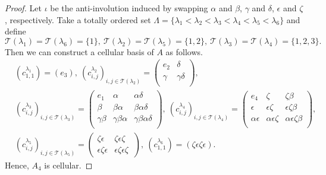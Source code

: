 \documentclass[12pt]{amsart}
\numberwithin{equation}{thm}
\newcommand\cT{\mathcal{T}}
\newcommand\la{\lambda}
\begin{document}
{\begin{proof}
Let $\iota$ be the anti-involution induced by swapping $\alpha$ and $\beta$, 
$\gamma$ and $\delta$, $\epsilon$ and $\zeta$, respectively.  
Take a totally ordered set
 $\Lambda=\{\lambda_1<\lambda_2<\lambda_3<\lambda_4<\lambda_5<\lambda_6\}$ and define
\[\cT(\lambda_1)=\cT(\lambda_6)=\{1\},\ \cT(\lambda_2)=\cT(\lambda_5)=\{1,2\},\
\cT(\lambda_3)=\cT(\lambda_4)=\{1,2,3\}.\]
Then we can construct a cellular basis of $A$ as follows.
\begin{align*}
& (c_{1,1}^{\lambda_1})=(e_3),\
 (c_{i,j}^{\lambda_2})_{i,j\in \cT(\la_2)}
    =\begin{pmatrix}
    e_2 & \delta \\
    \gamma & \gamma\delta \\
    \end{pmatrix},\\[7pt]
& (c_{i,j}^{\lambda_3})_{i,j\in \cT(\la_3)}
    =\begin{pmatrix}
    e_1 & \alpha & \alpha\delta \\
    \beta & \beta\alpha & \beta\alpha\delta \\
    \gamma\beta & \gamma\beta\alpha & \gamma\beta\alpha\delta \\
    \end{pmatrix},\   
  (c_{i,j}^{\lambda_4})_{i,j\in \cT(\la_4)}
    =\begin{pmatrix}
    e_4 & \zeta & \zeta\beta \\
    \epsilon & \epsilon\zeta & \epsilon\zeta\beta \\
    \alpha\epsilon & \alpha\epsilon\zeta & \alpha\epsilon\zeta\beta \\
    \end{pmatrix},\\[7pt]
& (c_{i,j}^{\lambda_5})_{i,j\in \cT(\la_5)}
    =\begin{pmatrix}
    \zeta\epsilon & \zeta\epsilon\zeta \\
    \epsilon\zeta\epsilon & \epsilon\zeta\epsilon\zeta \
    \end{pmatrix},\
  (c_{1,1}^{\lambda_6})=(\zeta\epsilon\zeta\epsilon).
 \end{align*}
Hence, $A_4$ is cellular.
\end{proof}


}
\end{document}
